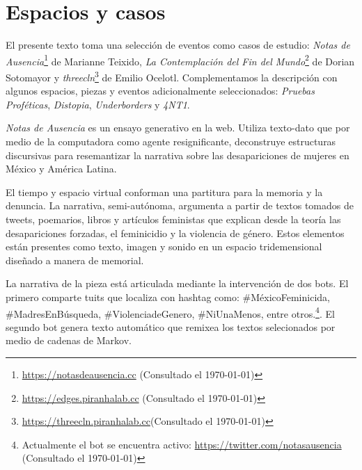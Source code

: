 
\section*{Espacios y casos} %

El presente texto toma una selección de eventos como casos de estudio: \textit{Notas de Ausencia}\footnote{\url{https://notasdeausencia.cc} (Consultado el \today)} de Marianne Teixido, \textit{La Contemplación del Fin del Mundo}\footnote{\url{https://edges.piranhalab.cc} (Consultado el \today)} de Dorian Sotomayor y \textit{threecln}\footnote{\url{https://threecln.piranhalab.cc}(Consultado el \today)} de Emilio Ocelotl. Complementamos la descripción con algunos espacios, piezas y eventos adicionalmente seleccionados: \textit{Pruebas Proféticas}, \textit{Distopia}, \textit{Underborders} y \textit{4NT1}. %



\textit{Notas de Ausencia} \citep{notasdeausencia} es un ensayo generativo en la web. Utiliza texto-dato que por medio de la computadora como agente resignificante, deconstruye estructuras discursivas para resemantizar la narrativa sobre las desapariciones de mujeres en México y América Latina.

El tiempo y espacio virtual conforman una partitura para la memoria y la denuncia. La narrativa, semi-autónoma, argumenta a partir de textos tomados de tweets, poemarios, libros y artículos feministas que explican desde la teoría las desapariciones forzadas, el feminicidio y la violencia de género. Estos elementos están presentes como texto, imagen y sonido en un espacio tridemensional diseñado a manera de memorial.

La narrativa de la pieza está articulada mediante la intervención de dos bots. El primero comparte tuits que localiza con hashtag como: \#MéxicoFeminicida, \#MadresEnBúsqueda, \#ViolenciadeGenero, \#NiUnaMenos, entre otros.\footnote{Actualmente el bot se encuentra activo: \url{https://twitter.com/notasausencia} (Consultado el \today)}. El segundo bot genera texto automático que remixea los textos selecionados por medio de cadenas de Markov.



